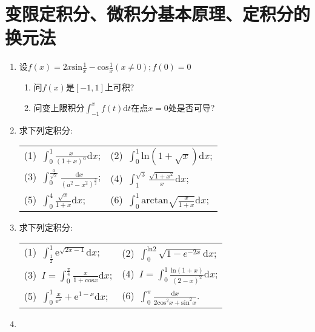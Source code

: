 \section{变限定积分、微积分基本原理、定积分的换元法}
\begin{enumerate}
	\item 设$f(x)=2x\mathrm{sin}\frac{1}{x}-\mathrm{cos}\frac{1}{x}(x\ne 0);f(0)=0$
	\begin{enumerate}
		\item 问$f(x)$是$[-1,1]$上可积?
		\item 问变上限积分$\displaystyle{\int_{-1}^{x}f(t)\mathrm{d}t}$在点$x=0$处是否可导?
	\end{enumerate}
	\item 求下列定积分:
	\begin{table}[H]
		\begin{tabular}{ll}
			(1)\ $\displaystyle{\int_{0}^{1}\frac{x}{(1+x)^\alpha}\mathrm{d}x}$;\qquad \qquad \qquad&(2)\ $\displaystyle{\int_{0}^{1}\mathrm{ln}(1+\sqrt{x})\mathrm{d}x}$;\\
			(3)\ $\displaystyle{\int_{0}^{\frac{a}{\sqrt{2}}}\frac{\mathrm{d}x}{(a^2-x^2)^{\frac{3}{2}}}}$;\qquad \qquad \qquad&(4)\ $\displaystyle{\int_{1}^{\sqrt{3}}\frac{\sqrt{1+x^2}}{x}\mathrm{d}x}$;\\
			(5)\ $\displaystyle{\int_{0}^{4}\frac{\sqrt{x}}{1+x}\mathrm{d}x}$;\qquad \qquad \qquad &(6)\
			 $\displaystyle{\int_{0}^{1}\mathrm{arctan}\sqrt{\frac{x}{1+x}}\mathrm{d}x}$;
		\end{tabular}
	\end{table}
	\item 求下列定积分:
		\begin{table}[H]
		\begin{tabular}{ll}
			(1)\ $\displaystyle{\int_{\frac{1}{2}}^{1}\mathrm{e}^{\sqrt{2x-1}}\mathrm{d}x}$;\qquad \qquad \qquad &(2)\ $\displaystyle{\int_{0}^{\mathrm{ln}2}\sqrt{1-e^{-2x}}\mathrm{d}x}$;\\
			(3)\ $\displaystyle{I=\int_{0}^{\frac{\pi}{4}}\frac{x}{1+\mathrm{cos}x}\mathrm{d}x}$;\qquad \qquad \qquad &(4)\ $\displaystyle{I = \int_{0}^{1}\frac{\mathrm{ln}(1+x)}{(2-x)^2}\mathrm{d}x}$;\\
				(5)\ $\displaystyle{\int_{0}^{1}\frac{x}{\mathrm{e}^x}+\mathrm{e}^{1-x}\mathrm{d}x}$;\qquad \qquad \qquad &(6)\ $\displaystyle{\int_{0}^{\pi}\frac{\mathrm{d}x}{2\mathrm{cos}^2x+\mathrm{sin}^2x}}$.
		\end{tabular}
	\end{table}
\item 

\end{enumerate}
